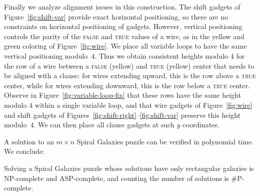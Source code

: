 Finally we analyze alignment issues in this construction.
The shift gadgets of Figure~\ref{fig:shift-var} provide exact
horizontal positioning, so there are no constraints on horizontal
positioning of gadgets.
However, vertical positioning controls the parity of the \textsc{false}
and \textsc{true} values of a wire, as in the yellow and green coloring
of Figure~\ref{fig:wire}.
We place all variable loops to have the same vertical positioning modulo~$4$.
Thus we obtain consistent heights modulo $4$
for the row of a wire between a \textsc{false} (yellow) and \textsc{true}
(yellow) center that needs to be aligned with a clause:
for wires extending upward, this is the row above a \textsc{true} center, while
for wires extending downward, this is the row below a \textsc{true} center.
Observe in Figure~\ref{fig:variable-loop-fix} that these rows have the
same height modulo $4$ within a single variable loop,
and that wire gadgets of Figure~\ref{fig:wire} and shift gadgets of
Figures~\ref{fig:shift-right}--\ref{fig:shift-var}
preserve this height modulo~$4$.
We can then place all clause gadgets at such $y$ coordinates.

A solution to an $m\times n$ Spiral Galaxies puzzle can be verified in polynomial time. We conclude: 

\begin{theorem}
	Solving a Spiral Galaxies puzzle whose solutions have only rectangular galaxies is NP-complete and ASP-complete, and counting the number of solutions is \#P-complete.
\end{theorem}

